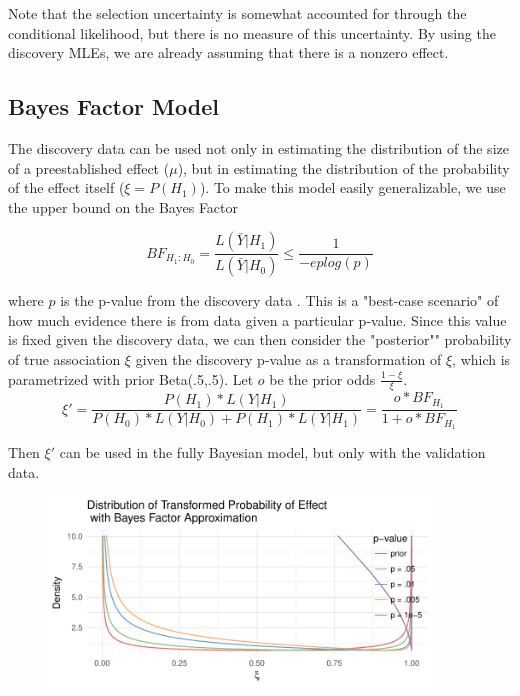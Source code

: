 \documentclass[AMA,STIX1COL]{WileyNJD-v2}\usepackage[]{graphicx}\usepackage[]{color}
\newenvironment{knitrout}{}{} %
\begin{document}
Note that the selection uncertainty is somewhat accounted for through the conditional likelihood, but there is no measure of this uncertainty. By using the discovery MLEs, we are already assuming that there is a nonzero effect.


\subsection{Bayes Factor Model}

The discovery data can be used not only in estimating the distribution of the size of a preestablished effect ($\mu$), but in estimating the distribution of the probability of the effect itself ($\xi = P(H_1)$). To make this model easily generalizable, we use the upper bound on the Bayes Factor

\begin{equation}\label{eq7}
BF_{H_1:H_0} = \frac{L(\bar Y | H_1)}{L(\bar Y | H_0)} \leq \frac{1}{-e p log(p)}
\end{equation}

where $p$ is the p-value from the discovery data \cite{sellke2001calibration}. This is a "best-case scenario" of how much evidence there is from data given a particular p-value. Since this value is fixed given the discovery data, we can then consider the "posterior"" probability of true association $\xi$ given the discovery p-value as a transformation of $\xi$, which is parametrized with prior Beta(.5,.5). Let $o$ be the prior odds $\frac{1-\xi}{\xi}$.
\begin{equation}\label{eq8}
\xi' = \frac{P(H_1)*L(Y|H_1)}{P(H_0)*L(Y|H_0)+P(H_1)*L(Y|H_1)} = \frac{o*BF_{H_1}}{1+o*BF_{H_1}}
\end{equation}

Then $\xi'$ can be used in the fully Bayesian model, but only with the validation data.




\begin{figure}
\begin{knitrout}
\color{fgcolor}

{\centering \includegraphics[width=4in]{figure/unnamed-chunk-5-1} 

}



\end{knitrout}
\end{figure}
\end{document}
